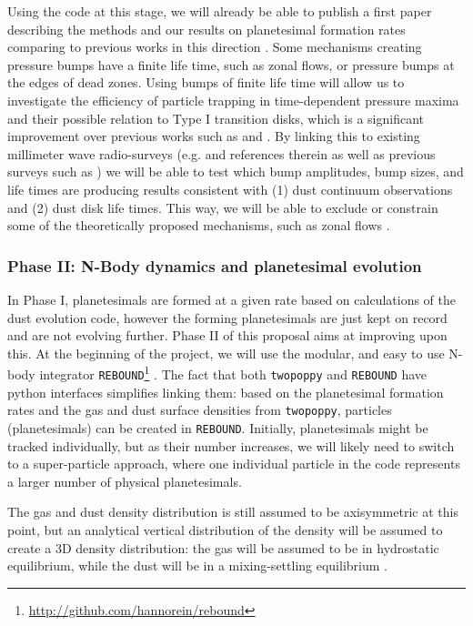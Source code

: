 \documentclass[10pt,fleqn,twoside]{article}
\newcommand{\twopoppy}{\texttt{twopoppy}\xspace}
\newcommand{\rebound}{\texttt{REBOUND}\xspace}
\begin{document}
Using the code at this stage, we will already be able to publish a
first paper describing the methods and our results on planetesimal
formation rates comparing to previous works in this direction
\citep[e.g.][]{2014A&A...572A..78D, 2016A&A...586A..20K}. Some
mechanisms creating pressure bumps have a finite life time, such as
zonal flows, or pressure bumps at the edges of dead zones. Using bumps
of finite life time will allow us to investigate the efficiency of
particle trapping in time-dependent pressure maxima and their possible
relation to Type I transition disks, which is a significant
improvement over previous works such as \citet{2012A&A...538A.114P}
and \citet{2013A&A...554A..95P}. By linking this to existing
millimeter wave radio-surveys (e.g.
\citealp{2016ApJ...831..125P} and references therein as well as
previous surveys such as \citealp{2010A&A...521A..66R}) we will be
able to test which bump amplitudes, bump sizes, and life times are
producing results consistent with (1) dust continuum observations and
(2) dust disk life times. This way, we will be able to exclude or
constrain some of the theoretically proposed mechanisms, such as zonal
flows \citep[e.g.,][]{2009ApJ...697.1269J, 2013ApJ...763..117D,
2014ApJ...796...31B}.

\subsubsection{Phase II: N-Body dynamics and planetesimal evolution}
\label{sec:phaseII}

In Phase I, planetesimals are formed at a given rate based on
calculations of the dust evolution code, however the forming
planetesimals are just kept on record and are not evolving further.
Phase II of this proposal aims at improving upon this. At the
beginning of the project, we will use the modular, and easy to use
N-body integrator
\rebound\footnote{\url{http://github.com/hannorein/rebound}}
\citep{2012A&A...537A.128R}. The fact that both \twopoppy and \rebound
have python interfaces simplifies linking them: based on the
planetesimal formation rates and the gas and dust surface densities
from \twopoppy, particles (planetesimals) can be created in \rebound.
Initially, planetesimals might be tracked individually, but as their
number increases, we will likely need to switch to a super-particle
approach, where one individual particle in the code represents a
larger number of physical planetesimals.

The gas and dust density distribution is still assumed to be
axisymmetric at this point, but an analytical vertical distribution of
the density will be assumed to create a 3D density distribution: the
gas will be assumed to be in hydrostatic equilibrium, while the dust
will be in a mixing-settling equilibrium \citep{2009A&A...496..597F}.
\end{document}
